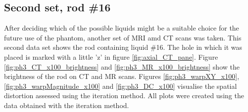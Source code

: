 \clearpage

\subsection{Second set, rod \#16}
\label{sec:rod16}

After deciding which of the possible liquids might be a suitable choice for the future use of the phantom, another set of MRI amd CT scans was taken.
This second data set shows the rod containing liquid \#16.
The hole in which it was placed is marked with a little 'z' in figure \ref{fig:axial_CT_pane}.
Figure \ref{fig:ph3_CT_x100_brightness} and \ref{fig:ph3_MR_x100_brightness} show the brightness of the rod on CT and MR scans.
Figures \ref{fig:ph3_warpXY_x100}, \ref{fig:ph3_warpMagnitude_x100} and \ref{fig:ph3_DC_x100} visualise the spatial distortion assessed using the iteration method.
All plots were created using the data obtained with the iteration method.


